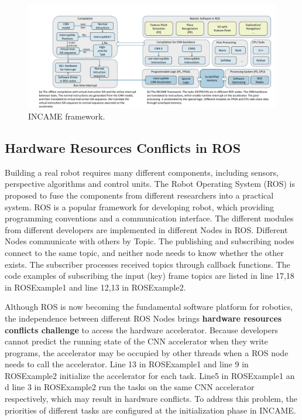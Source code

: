 \label{sec:incame}

\begin{figure}[t]
	\centering
    \includegraphics[width=0.99\linewidth]{fig/incame.pdf}
    \caption{ INCAME framework.}
	\label{fig:incame}
\end{figure}

\subsection{Hardware Resources Conflicts in ROS}

Building a real robot requires many different components, including sensors, perspective algorithms and control units. The Robot Operating System (ROS) \cite{quigley2009ros} is proposed to fuse the components from different researchers into a practical system. ROS \cite{quigley2009ros} is a popular framework for developing robot, which providing programming conventions and a communication interface. The different modules from different developers are implemented in different Nodes in ROS. Different Nodes communicate with others by Topic. The publishing and subscribing nodes connect to the same topic, and neither node needs to know whether the other exists. The subscriber processes received topics through callback functions. The code examples of subscribing the input (key) frame topics are listed in line 17,18 in ROSExample1 and line 12,13 in ROSExample2.

Although ROS is now becoming the fundamental software platform for robotics, the independence between different ROS Nodes brings \textbf{hardware resources conflicts challenge} to access the hardware accelerator. 
Because developers cannot predict the running state of the CNN accelerator when they write programs, the accelerator may be occupied by other threads when a ROS node needs to call the accelerator.
Line 13 in ROSExample1 and line 9 in ROSExample2 initialize the accelerator for each task. Line5 in ROSExample1 an d line 3 in ROSExample2 run the tasks on the same CNN accelerator respectively, which may result in hardware conflicts. 
To address this problem, the priorities of different tasks are configured at the initialization phase in INCAME.

